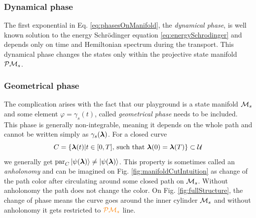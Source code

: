 \subsubsection{Dynamical phase}
The first exponential in Eq. \ref{eq:phasesOnManifold}, the \emph{dynamical phase}, is well known solution to the energy Schr\"odinger equation \ref{eq:energySchrodinger} and depends only on time and Hemiltonian spectrum during the transport. This dynamical phase changes the states only within the projective state manifold $\mathcal{P}\mathcal{M}_s$. 

\subsubsection{Geometrical phase}
The complication arises with the fact that our playground is a state manifold $\mathcal{M}_s$ and some element $\varphi=\gamma_s(t)$, called \emph{geometrical phase} needs to be included. This phase is generally non-integrable, meaning it depends on the whole path and cannot be written simply as $\gamma_s({\bm\lambda})$. For a closed curve
\begin{equation}
    C=\{{\bm\lambda}(t)|t\in[0,T] \text{, such that }{\bm\lambda}(0)={\bm\lambda}(T)\}\subset \mathcal U
\end{equation} 
we generally get $\textrm{par}_C \ket{\psi({\bm\lambda})}\neq \ket{\psi({\bm\lambda})}$. This property is sometimes called an \emph{anholonomy} and can be imagined on Fig. \ref{fig:manifoldCutIntuition} as change of the path color after circulating around some closed path on $\mathcal{M}_s$. Without anholonomy the path does not change the color. On Fig. \ref{fig:fullStructure}, the change of phase means the curve goes around the inner cylinder $\mathcal{M}_s$ and without anholonomy it gets restricted to $\textcolor{orange}{\mathcal{P}\mathcal{M}_s}$ line.

